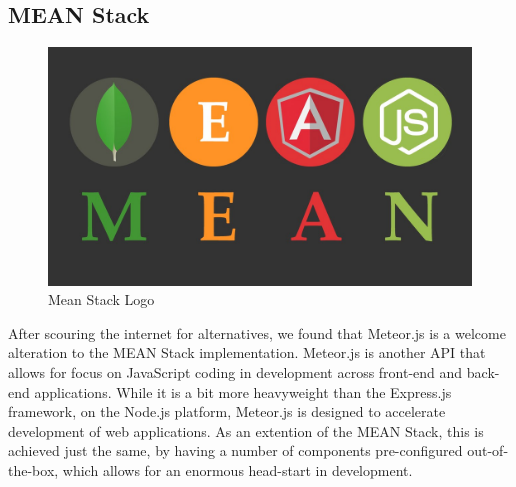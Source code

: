 \documentclass[12pt,a4paper]{report}
\begin{document}
		\subsection{MEAN Stack}
		\begin{figure}[H]
			\centering
			\includegraphics[scale=.2]{meanStack}
			\caption{Mean Stack Logo}
			\label{fig: Mean Stack Logo}
		\end{figure}
		After scouring the internet for alternatives, we found that Meteor.js is a welcome alteration to the MEAN Stack implementation. Meteor.js is another API that allows for focus on JavaScript coding in development across front-end and back-end applications. While it is a bit more heavyweight than the Express.js framework, on the Node.js platform, Meteor.js is designed to accelerate development of web applications. As an extention of the MEAN Stack, this is achieved just the same, by having a number of components pre-configured out-of-the-box, which allows for an enormous head-start in development.
			\newpage
\end{document}
